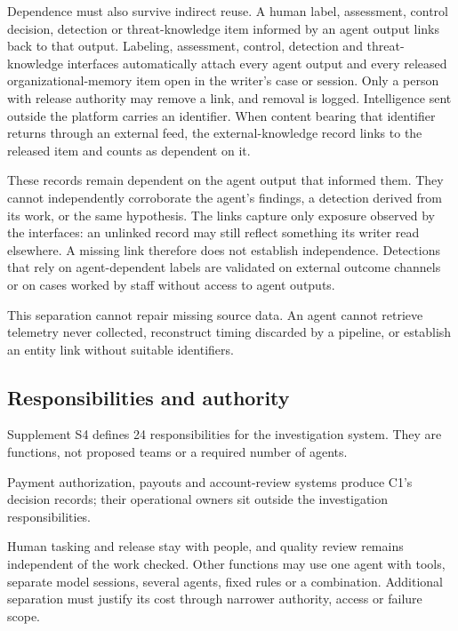 \documentclass[acmlarge,review,anonymous,nonacm]{acmart}
\begin{document}
Dependence must also survive indirect reuse. A human label, assessment,
control decision, detection or threat-knowledge item informed by an
agent output links back to that output. Labeling, assessment, control,
detection and threat-knowledge interfaces automatically attach every
agent output and every released organizational-memory item open in the
writer's case or session. Only a person with release authority may
remove a link, and removal is logged. Intelligence sent outside the
platform carries an identifier. When content bearing that identifier
returns through an external feed, the external-knowledge record links to
the released item and counts as dependent on it.

These records remain dependent on the agent output that informed them.
They cannot independently corroborate the agent's findings, a detection
derived from its work, or the same hypothesis. The links capture only
exposure observed by the interfaces: an unlinked record may still
reflect something its writer read elsewhere. A missing link therefore
does not establish independence. Detections that rely on agent-dependent
labels are validated on external outcome channels or on cases worked by
staff without access to agent outputs.

This separation cannot repair missing source data. An agent cannot
retrieve telemetry never collected, reconstruct timing discarded by a
pipeline, or establish an entity link without suitable identifiers.

\hypertarget{responsibilities-and-authority}{%
\subsection{Responsibilities and
authority}\label{responsibilities-and-authority}}

Supplement S4 defines 24 responsibilities for the investigation system.
They are functions, not proposed teams or a required number of agents.

Payment authorization, payouts and account-review systems produce C1's
decision records; their operational owners sit outside the investigation
responsibilities.

Human tasking and release stay with people, and quality review remains
independent of the work checked. Other functions may use one agent with
tools, separate model sessions, several agents, fixed rules or a
combination. Additional separation must justify its cost through
narrower authority, access or failure scope.
\end{document}
